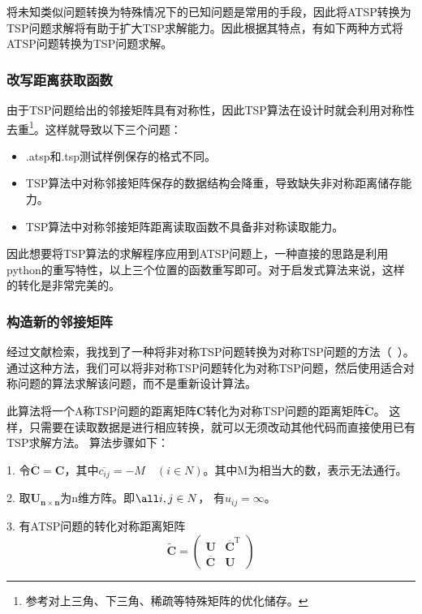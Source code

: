 \documentclass[lang=cn,11pt]{elegantpaper}
\begin{document}
将未知类似问题转换为特殊情况下的已知问题是常用的手段，因此将ATSP转换为TSP问题求解将有助于扩大TSP求解能力。因此根据其特点，有如下两种方式将ATSP问题转换为TSP问题求解。
\subsubsection{改写距离获取函数}
由于TSP问题给出的邻接矩阵具有对称性，因此TSP算法在设计时就会利用对称性去重\footnote{参考对上三角、下三角、稀疏等特殊矩阵的优化储存。}。这样就导致以下三个问题：
\begin{itemize}
    \item .atsp和.tsp测试样例保存的格式不同。
    \item TSP算法中对称邻接矩阵保存的数据结构会降重，导致缺失非对称距离储存能力。
    \item TSP算法中对称邻接矩阵距离读取函数不具备非对称读取能力。
\end{itemize}  

因此想要将TSP算法的求解程序应用到ATSP问题上，一种直接的思路是利用python的重写特性，以上三个位置的函数重写即可。对于启发式算法来说，这样的转化是非常完美的。


\subsubsection{构造新的邻接矩阵}
经过文献检索，我找到了一种将非对称TSP问题转换为对称TSP问题的方法（~\cite{VOLGENANT1983}）。
通过这种方法，我们可以将非对称TSP问题转化为对称TSP问题，然后使用适合对称问题的算法求解该问题，而不是重新设计算法。

此算法将一个A称TSP问题的距离矩阵$\boldsymbol{C}$转化为对称TSP问题的距离矩阵$\tilde{\boldsymbol{C}}$。
这样，只需要在读取数据是进行相应转换，就可以无须改动其他代码而直接使用已有TSP求解方法。
算法步骤如下：

1. 令$\overline{\boldsymbol{C}}=\boldsymbol{C}$，其中$\overline{c_{ij}} = - M \quad(i \in N)$。其中M为相当大的数，表示无法通行。

2. 取$\boldsymbol{U_{n\times n}}$为n维方阵。即$\all i,j \in N $， 有$u_{ij}=\infty$。

3. 有ATSP问题的转化对称距离矩阵
\begin{equation}
\tilde{\boldsymbol{C}}=
    \left(
        \begin{smallmatrix}
        \boldsymbol{U} & \overline{\boldsymbol{C}}^\mathrm{T} \\
        \overline{\boldsymbol{C}} & \boldsymbol{U}
        \end{smallmatrix}
    \right)
\label{eq:cMatrix}
\end{equation}
\end{document}
